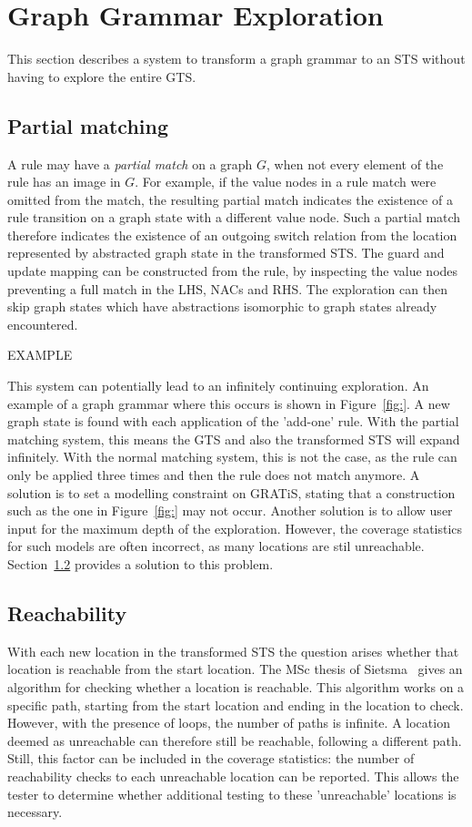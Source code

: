 \section{Graph Grammar Exploration}\label{sec:gg-exploration}

This section describes a system to transform a graph grammar to an STS without having to explore the entire GTS.

\subsection{Partial matching}
A rule may have a \textit{partial match} on a graph $G$, when not every element of the rule has an image in $G$. For example, if the value nodes in a rule match were omitted from the match, the resulting partial match indicates the existence of a rule transition on a graph state with a different value node. Such a partial match therefore indicates the existence of an outgoing switch relation from the location represented by abstracted graph state in the transformed STS. The guard and update mapping can be constructed from the rule, by inspecting the value nodes preventing a full match in the LHS, NACs and RHS. The exploration can then skip graph states which have abstractions isomorphic to graph states already encountered.

EXAMPLE

This system can potentially lead to an infinitely continuing exploration. An example of a graph grammar where this occurs is shown in Figure~\ref{fig:}. A new graph state is found with each application of the 'add-one' rule. With the partial matching system, this means the GTS and also the transformed STS will expand infinitely. With the normal matching system, this is not the case, as the rule can only be applied three times and then the rule does not match anymore. A solution is to set a modelling constraint on GRATiS, stating that a construction such as the one in Figure~\ref{fig:} may not occur. Another solution is to allow user input for the maximum depth of the exploration. However, the coverage statistics for such models are often incorrect, as many locations are stil unreachable. Section~\ref{sec:reachability} provides a solution to this problem. 

\subsection{Reachability}\label{sec:reachability}
With each new location in the transformed STS the question arises whether that location is reachable from the start location. The MSc thesis of Sietsma~\cite{Sietsma:reachability} gives an algorithm for checking whether a location is reachable. This algorithm works on a specific path, starting from the start location and ending in the location to check. However, with the presence of loops, the number of paths is infinite. A location deemed as unreachable can therefore still be reachable, following a different path. Still, this factor can be included in the coverage statistics: the number of reachability checks to each unreachable location can be reported. This allows the tester to determine whether additional testing to these 'unreachable' locations is necessary.
